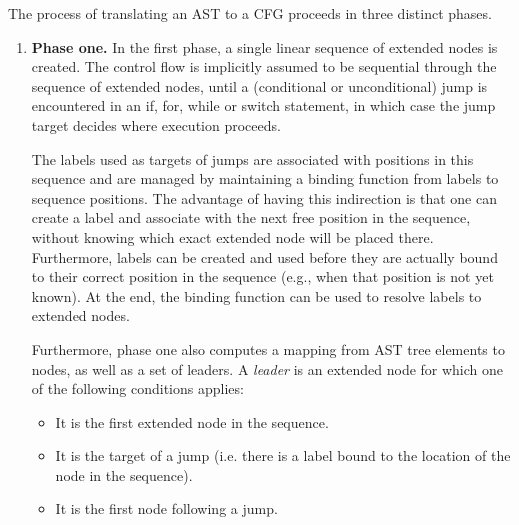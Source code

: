 The process of translating an AST to a CFG proceeds in three distinct phases.
\begin{enumerate}
    \item \textbf{Phase one.} In the first phase, a single linear sequence of extended nodes is created. The control flow is implicitly
    assumed to be sequential through the sequence of extended nodes, until a (conditional
    or unconditional) jump is encountered in an if, for, while or switch statement, in which
    case the jump target decides where execution proceeds.
    
    The labels used as targets of jumps are associated with positions in this sequence and are managed
    by maintaining a binding function from labels to sequence positions. The advantage of
    having this indirection is that one can create a label and associate with the next free
    position in the sequence, without knowing which exact extended node will be placed there.
    Furthermore, labels can be created and used before they are actually bound to their correct
    position in the sequence (e.g., when that position is not yet known).
    At the end, the binding function can be used to resolve labels to
    extended nodes.
    
    Furthermore, phase one also computes a mapping from AST tree elements to nodes, as well
    as a set of leaders. A \emph{leader} is an extended node for which one of the following
    conditions applies:
    \begin{itemize}
    \item It is the first extended node in the sequence.
    \item It is the target of a jump (i.e. there is a label bound to the location of the node
    in the sequence).
    \item It is the first node following a jump.
    \end{itemize}
    

\end{enumerate}
